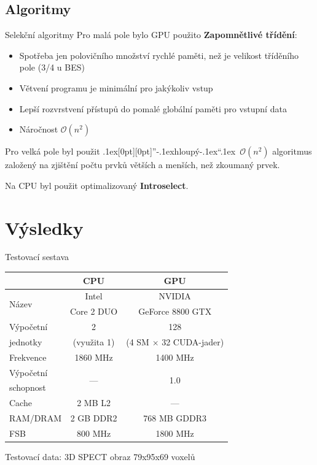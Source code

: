 \documentclass[compress,mathserif]{beamer}
\def\bq{\mbox{\kern.1ex\protect\raisebox{-1.3ex}[0pt][0pt]{''}\kern-.1ex}}
\def\eq{\mbox{\kern-.1ex``\kern.1ex}}
\theoremstyle{definition}
\theoremstyle{plain}
\newcommand{\beI}{\begin{itemize}}
\newcommand{\enI}{\end{itemize}}
\begin{document}
\subsection{Algoritmy}
     \begin{frame}{Selekční algoritmy}
      Pro malá pole bylo GPU použito \textbf{Zapomnětlivé třídění}:
      \beI
        \item Spotřeba jen polovičního množství rychlé paměti, než je velikost tříděního pole (3/4 u BES)
        \item Větvení programu je minimální pro jakýkoliv vstup
        \item Lepší rozvrstvení přístupů do pomalé globální paměti pro vstupní data
        \item Náročnost $\mathcal{O}(n^2)$
      \enI
      Pro velká pole byl použit \bq hloupý\eq~$\mathcal{O}(n^2)$ algoritmus založený na
      zjištění počtu prvků větších a menších, než zkoumaný prvek.
      \vspace{5pt}

      Na CPU byl použit optimalizovaný \textbf{Introselect}.
    \end{frame}


\section{Výsledky}
    \begin{frame}{Testovací sestava}
        \begin{table}
        \begin{tabular}{lcc}
          \toprule
          & CPU & GPU \\
          \midrule
          \multirow{2}{*}{Název} & Intel & NVIDIA \\
          & Core 2 DUO & GeForce 8800 GTX \\
          Výpočetní & 2 & 128 \\
          jednotky & (využita 1) & (4 SM $\times$ 32 CUDA-jader) \\
          Frekvence & 1860 MHz & 1400 MHz \\
          Výpočetní & \multirow{2}{*}{---} & \multirow{2}{*}{1.0} \\
          schopnost & & \\
          Cache & 2 MB L2 & --- \\
          RAM/DRAM & 2 GB DDR2 & 768 MB GDDR3 \\
          FSB & 800 MHz & 1800 MHz \\
          \bottomrule
        \end{tabular}
        \end{table}
        \begin{center}
           Testovací data: 3D SPECT obraz 79x95x69 voxelů
        \end{center}

    \end{frame}
\end{document}
